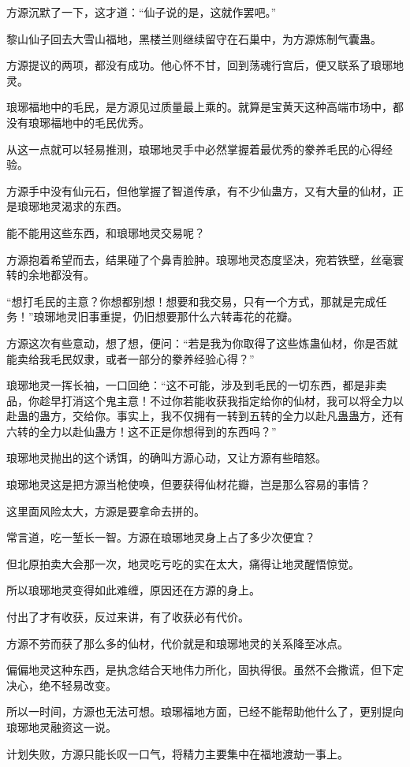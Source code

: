 \begin{this_body}
方源沉默了一下，这才道：“仙子说的是，这就作罢吧。”

黎山仙子回去大雪山福地，黑楼兰则继续留守在石巢中，为方源炼制气囊蛊。

方源提议的两项，都没有成功。他心怀不甘，回到荡魂行宫后，便又联系了琅琊地灵。

琅琊福地中的毛民，是方源见过质量最上乘的。就算是宝黄天这种高端市场中，都没有琅琊福地中的毛民优秀。

从这一点就可以轻易推测，琅琊地灵手中必然掌握着最优秀的豢养毛民的心得经验。

方源手中没有仙元石，但他掌握了智道传承，有不少仙蛊方，又有大量的仙材，正是琅琊地灵渴求的东西。

能不能用这些东西，和琅琊地灵交易呢？

方源抱着希望而去，结果碰了个鼻青脸肿。琅琊地灵态度坚决，宛若铁壁，丝毫寰转的余地都没有。

“想打毛民的主意？你想都别想！想要和我交易，只有一个方式，那就是完成任务！”琅琊地灵旧事重提，仍旧想要那什么六转毒花的花瓣。

方源这次有些意动，想了想，便问：“若是我为你取得了这些炼蛊仙材，你是否就能卖给我毛民奴隶，或者一部分的豢养经验心得？”

琅琊地灵一挥长袖，一口回绝：“这不可能，涉及到毛民的一切东西，都是非卖品，你趁早打消这个鬼主意！不过你若能收获我指定给你的仙材，我可以将全力以赴蛊的蛊方，交给你。事实上，我不仅拥有一转到五转的全力以赴凡蛊蛊方，还有六转的全力以赴仙蛊方！这不正是你想得到的东西吗？”

琅琊地灵抛出的这个诱饵，的确叫方源心动，又让方源有些暗怒。

琅琊地灵这是把方源当枪使唤，但要获得仙材花瓣，岂是那么容易的事情？

这里面风险太大，方源是要拿命去拼的。

常言道，吃一堑长一智。方源在琅琊地灵身上占了多少次便宜？

但北原拍卖大会那一次，地灵吃亏吃的实在太大，痛得让地灵醒悟惊觉。

所以琅琊地灵变得如此难缠，原因还在方源的身上。

付出了才有收获，反过来讲，有了收获必有代价。

方源不劳而获了那么多的仙材，代价就是和琅琊地灵的关系降至冰点。

偏偏地灵这种东西，是执念结合天地伟力所化，固执得很。虽然不会撒谎，但下定决心，绝不轻易改变。

所以一时间，方源也无法可想。琅琊福地方面，已经不能帮助他什么了，更别提向琅琊地灵融资这一说。

计划失败，方源只能长叹一口气，将精力主要集中在福地渡劫一事上。


\end{this_body}
